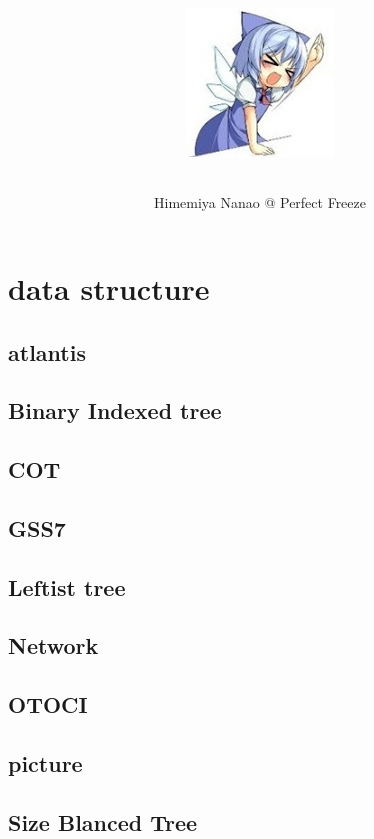 \documentclass[a4paper,5pt,titlepage]{article}
\title{\TitleFont{Code Library}
    \begin{center}
\includegraphics[scale=2]{./image1.png}
    \end{center}
}
\author{Himemiya Nanao @ Perfect Freeze}
\begin{document}

\maketitle \tableofcontents

\newpage
{}

\section{data structure}
\subsection{atlantis}

\subsection{Binary Indexed tree}

\subsection{COT}

\subsection{GSS7}

\subsection{Leftist tree}

\subsection{Network}

\subsection{OTOCI}

\subsection{picture}

\subsection{Size Blanced Tree}

\end{document}
